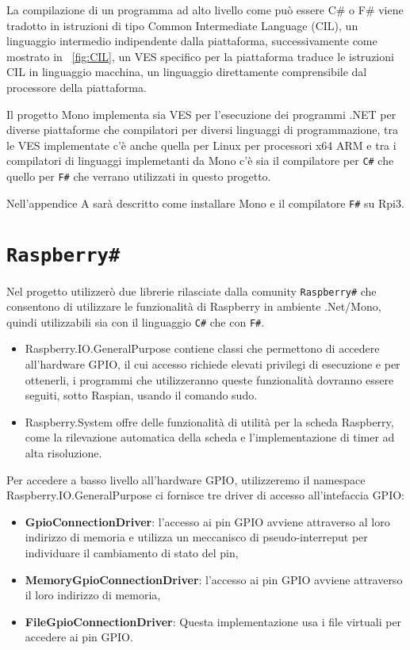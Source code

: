 La compilazione di un programma ad alto livello come può essere C# o F# viene tradotto in istruzioni di tipo Common Intermediate Language (CIL), un linguaggio intermedio indipendente dalla piattaforma, successivamente
come mostrato in \figurename~\ref{fig:CIL},  un VES specifico per la piattaforma traduce le istruzioni CIL in linguaggio macchina, un linguaggio direttamente comprensibile dal processore della piattaforma.

Il progetto Mono implementa sia VES per l'esecuzione dei programmi .NET per diverse piattaforme che compilatori per diversi linguaggi di programmazione, tra le VES implementate c'è anche quella per Linux per processori x64 ARM e tra i compilatori di linguaggi implemetanti da Mono c'è sia il compilatore per \texttt{C\#} che quello per \texttt{F\#} che verrano utilizzati in questo progetto.

Nell'appendice A sarà  descritto come installare Mono e il compilatore \texttt{F\#} su Rpi3.

\section{\texttt{Raspberry\#}}
Nel progetto utilizzerò due librerie rilasciate dalla comunity \texttt{Raspberry\#}  che consentono di utilizzare le funzionalità di Raspberry in ambiente .Net/Mono, quindi utilizzabili sia con il linguaggio \texttt{C\#} che con \texttt{F\#}.



\begin{itemize}
\item Raspberry.IO.GeneralPurpose  contiene classi che permettono di accedere all'hardware GPIO, il cui accesso richiede elevati privilegi di esecuzione e per ottenerli, i programmi che utilizzeranno queste funzionalità dovranno essere seguiti, sotto Raspian, usando il comando sudo.
\item Raspberry.System offre delle funzionalità di utilità per la scheda Raspberry, come la rilevazione automatica della scheda e l'implementazione di timer ad alta risoluzione.
\end{itemize}


Per  accedere a basso livello all'hardware GPIO, utilizzeremo il namespace Raspberry.IO.GeneralPurpose ci fornisce tre driver di accesso all'intefaccia GPIO:
\begin{itemize}
\item \textbf{GpioConnectionDriver}: l'accesso ai pin GPIO avviene attraverso al loro indirizzo di memoria e  utilizza un meccanisco di pseudo-interreput per individuare il cambiamento di stato del pin,
\item \textbf{MemoryGpioConnectionDriver}: l'accesso ai pin GPIO avviene attraverso il loro indirizzo di memoria,
\item \textbf{FileGpioConnectionDriver}: Questa implementazione usa i file virtuali  per accedere ai pin GPIO.
\end{itemize}

